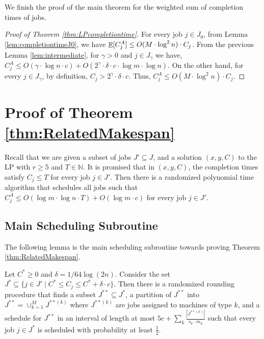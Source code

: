   We finish the proof of the main theorem for the weighted sum of completion times of jobs.
  
  \begin{proof} [Proof of Theorem \ref{thm:LPcompletiontime}]
  For every job $j \in J_0$, from Lemma \ref{lem:completiontimeJ0},  we have $\mathop{\mathbb{E}}[C^A_j] \leq O(M \cdot \log^2 n) \cdot C_j$.
  From the previous Lemma \ref{lem:intermediate}, for $\gamma  > 0$ and $j \in J_{\gamma }$ we have, $C^A_j \leq O(\gamma \cdot \log n \cdot c) + O(2^{\gamma } \cdot \delta \cdot c \cdot \log m \cdot \log n )$.
  On the other hand,  for every $j \in J_{\gamma}$, by definition, $C_j >  2^{\gamma} \cdot \delta \cdot c$.
  Thus, $C^A_j \leq  O(M \cdot \log^2 n) \cdot C_j$.
  \end{proof}
  
  
  
  \section{Proof of Theorem \ref{thm:RelatedMakespan}}
  \label{sec:makespan}
  
  Recall that we are given a subset of jobs $J' \subseteq J$, and a solution $(x,y,C)$ to the LP with $r \geq 5$ and  $T \in \mathbb{N}$.
  It is promised that in  $(x,y,C)$, the completion times satisfy $C_j \leq T$ for every job $j \in J'$.
  Then there is a randomized polynomial time algorithm that schedules all jobs such that $C_j^A \leq O(\log m  \cdot \log n  \cdot T) + O(\log m \cdot c)$ for every job $j \in J'$. 
  
  \subsection{Main Scheduling Subroutine}
  \label{subsec:singlebatchrelated}
  
  The following lemma is the main scheduling subroutine towards proving Theorem \ref{thm:RelatedMakespan}. 
  
  \begin{lemma} \label{lem:RSchedulingOneIntervalViaCKR}
  Let $C^* \geq 0$ and $\delta = 1/64\log(2n)$. 
  Consider the set $J^* \subseteq \{ j \in J' \mid C^* \leq C_j \leq C^*+\delta \cdot c \}$.
  Then there is a randomized rounding procedure that finds a subset $J^{**} \subseteq J^*$,
  a partition of $J^{**}$ into $J^{**} = \cup_{k=1}^{M} J^{**(k)}$ where $J^{**(k)}$ are jobs assigned to machines of type $k$,
  and a schedule for $J^{**}$ in an interval of length at most $5c+\sum_k \frac{|J^{**(k)}|}{s_k \cdot m_k}$ such that every job $j \in J^*$
  is scheduled with probability at least $\frac{1}{2}$.
  \end{lemma}
  

